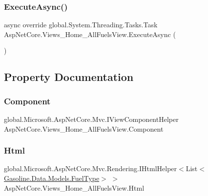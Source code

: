 \subsubsection{\texorpdfstring{ExecuteAsync()}{ExecuteAsync()}}
{\footnotesize\ttfamily async override global.\+System.\+Threading.\+Tasks.\+Task Asp\+Net\+Core.\+Views\+\_\+\+Home\+\_\+\+All\+Fuels\+View.\+Execute\+Async (\begin{DoxyParamCaption}{ }\end{DoxyParamCaption})}



\subsection{Property Documentation}
\mbox{\label{class_asp_net_core_1_1_views___home___all_fuels_view_a35c5a53e65971cfc60a4cfa1d2559cfc}} 
\subsubsection{\texorpdfstring{Component}{Component}}
{\footnotesize\ttfamily global.\+Microsoft.\+Asp\+Net\+Core.\+Mvc.\+I\+View\+Component\+Helper Asp\+Net\+Core.\+Views\+\_\+\+Home\+\_\+\+All\+Fuels\+View.\+Component\hspace{0.3cm}{\ttfamily [get]}}

\mbox{\label{class_asp_net_core_1_1_views___home___all_fuels_view_aae98f51af2d8f72f30b7afff7a1f1563}} 
\subsubsection{\texorpdfstring{Html}{Html}}
{\footnotesize\ttfamily global.\+Microsoft.\+Asp\+Net\+Core.\+Mvc.\+Rendering.\+I\+Html\+Helper$<$List$<$\mbox{\hyperlink{class_gasoline_1_1_data_1_1_models_1_1_fuel_type}{Gasoline.\+Data.\+Models.\+Fuel\+Type}}$>$ $>$ Asp\+Net\+Core.\+Views\+\_\+\+Home\+\_\+\+All\+Fuels\+View.\+Html\hspace{0.3cm}{\ttfamily [get]}}

